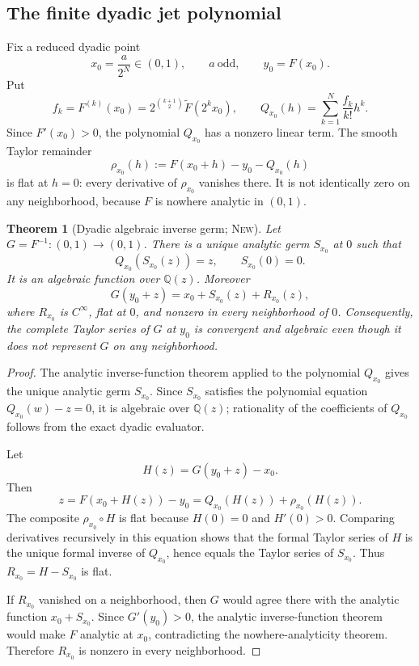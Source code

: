 \documentclass[11pt,oneside]{article}
\theoremstyle{frontier}
\newtheorem{theorem}{Theorem}[section]
\theoremstyle{definition}
\theoremstyle{remark}
\newcommand{\Q}{\mathbb Q}
\newcommand{\GF}{\widetilde F}
\newcommand{\InvF}{G}
\newcommand{\statusnew}{\textsc{New}}
\begin{document}
\subsection{The finite dyadic jet polynomial}

Fix a reduced dyadic point
\begin{equation}
 x_0=\frac{a}{2^N}\in(0,1),\qquad a\ \text{odd},
 \qquad y_0=F(x_0).
 \label{eq:x0-y0}
\end{equation}
Put
\begin{equation}
 f_k=F^{(k)}(x_0)
 =2^{\binom{k+1}{2}}\GF(2^kx_0),
 \qquad
 Q_{x_0}(h)=\sum_{k=1}^{N}\frac{f_k}{k!}h^k.
 \label{eq:Q-dyadic}
\end{equation}
Since $F'(x_0)>0$, the polynomial $Q_{x_0}$ has a nonzero linear term.  The smooth Taylor
remainder
\begin{equation}
 \rho_{x_0}(h):=F(x_0+h)-y_0-Q_{x_0}(h)
 \label{eq:rho-flat}
\end{equation}
is flat at $h=0$: every derivative of $\rho_{x_0}$ vanishes there.  It is not identically zero on any
neighborhood, because $F$ is nowhere analytic in $(0,1)$.

\begin{theorem}[Dyadic algebraic inverse germ; \statusnew]
\label{thm:algebraic-inverse-germ}
Let $\InvF=F^{-1}:(0,1)\to(0,1)$.  There is a unique analytic germ $S_{x_0}$ at $0$ such that
\begin{equation}
 Q_{x_0}(S_{x_0}(z))=z,
 \qquad S_{x_0}(0)=0.
 \label{eq:S-inverse}
\end{equation}
It is an algebraic function over $\Q(z)$.  Moreover
\begin{equation}
 \boxed{
 \InvF(y_0+z)=x_0+S_{x_0}(z)+R_{x_0}(z),
 }
 \label{eq:G-shadow}
\end{equation}
where $R_{x_0}$ is $C^\infty$, flat at $0$, and nonzero in every neighborhood of $0$.
Consequently, the complete Taylor series of $\InvF$ at $y_0$ is convergent and algebraic even
though it does not represent $\InvF$ on any neighborhood.
\end{theorem}

\begin{proof}
The analytic inverse-function theorem applied to the polynomial $Q_{x_0}$ gives the unique analytic
germ $S_{x_0}$.  Since $S_{x_0}$ satisfies the polynomial equation
$Q_{x_0}(w)-z=0$, it is algebraic over $\Q(z)$; rationality of the coefficients of $Q_{x_0}$ follows
from the exact dyadic evaluator.

Let
\[
 H(z)=\InvF(y_0+z)-x_0.
\]
Then
\[
 z=F(x_0+H(z))-y_0=Q_{x_0}(H(z))+\rho_{x_0}(H(z)).
\]
The composite $\rho_{x_0}\circ H$ is flat because $H(0)=0$ and $H'(0)>0$.  Comparing derivatives
recursively in this equation shows that the formal Taylor series of $H$ is the unique formal inverse
of $Q_{x_0}$, hence equals the Taylor series of $S_{x_0}$.  Thus $R_{x_0}=H-S_{x_0}$ is flat.

If $R_{x_0}$ vanished on a neighborhood, then $\InvF$ would agree there with the analytic function
$x_0+S_{x_0}$.  Since $\InvF'(y_0)>0$, the analytic inverse-function theorem would make $F$
analytic at $x_0$, contradicting the nowhere-analyticity theorem.  Therefore $R_{x_0}$ is nonzero in
every neighborhood.
\end{proof}
\end{document}
